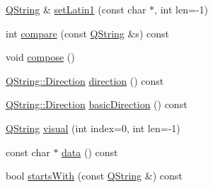 \begin{DoxyCompactItemize}
\item 
\mbox{\hyperlink{class_q_string}{Q\+String}} \& \mbox{\hyperlink{class_q_string_ab7df9df250d260fd19067f9c921c0047}{set\+Latin1}} (const char $\ast$, int len=-\/1)
\item 
int \mbox{\hyperlink{class_q_string_ac679c7d23beb9bf676e58fc0a36528f1}{compare}} (const \mbox{\hyperlink{class_q_string}{Q\+String}} \&s) const
\item 
void \mbox{\hyperlink{class_q_string_a1b04937a2233337016aafaa546ef83a9}{compose}} ()
\item 
\mbox{\hyperlink{class_q_string_acaff43b133319ea651f19aac6b967406}{Q\+String\+::\+Direction}} \mbox{\hyperlink{class_q_string_a0fc0ce8cad187317ef119383e38c6457}{direction}} () const
\item 
\mbox{\hyperlink{class_q_string_acaff43b133319ea651f19aac6b967406}{Q\+String\+::\+Direction}} \mbox{\hyperlink{class_q_string_aa457fbe724b457a57950db1de0b42aca}{basic\+Direction}} () const
\item 
\mbox{\hyperlink{class_q_string}{Q\+String}} \mbox{\hyperlink{class_q_string_aaadfa2ae50754aa87fed66d04b4f8e2b}{visual}} (int index=0, int len=-\/1)
\item 
const char $\ast$ \mbox{\hyperlink{class_q_string_a3fd84b8263c26c6539fe6f5ea1055ee5}{data}} () const
\item 
bool \mbox{\hyperlink{class_q_string_abce31b19d1051891f32f90b05a3a5eae}{starts\+With}} (const \mbox{\hyperlink{class_q_string}{Q\+String}} \&) const
\end{DoxyCompactItemize}
